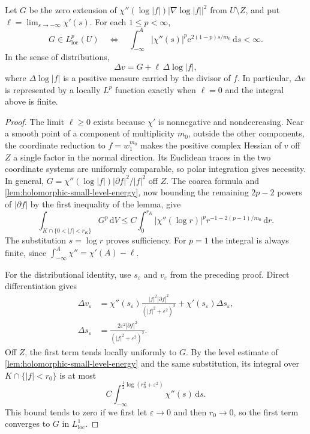 \begin{proposition}\label{prop:divisorial-laplacian-residual}
Let $G$ be the zero extension of
$\chi''(\log|f|)|\nabla\log|f||^2$ from $U\setminus Z$, and put $\ell=\lim_{s\to-\infty}\chi'(s)$. For each $1\leq p<\infty$,
\[
 G\in L^p_{\mathrm{loc}}(U)
 \quad\Longleftrightarrow\quad
 \int_{-\infty}^A|\chi''(s)|^p
        \mathrm e^{2(1-p)s/m_0}\,\mathrm ds<\infty.
\]
In the sense of distributions,
\[
 \Delta v=G+\ell\,\Delta\log|f|,
\]
where $\Delta\log|f|$ is a positive measure carried by the divisor of $f$. In particular, $\Delta v$ is represented by a locally $L^p$ function exactly when $\ell=0$ and the integral above is finite.
\end{proposition}
\begin{proof}
The limit $\ell\geq0$ exists because $\chi'$ is nonnegative and nondecreasing. Near a smooth point of a component of multiplicity $m_0$, outside the other components, the coordinate reduction to $f=w_1^{m_0}$ makes the positive complex Hessian of $v$ off $Z$ a single factor in the normal direction. Its Euclidean traces in the two coordinate systems are uniformly comparable, so polar integration gives necessity. In general,
$G=\chi''(\log|f|)|\partial f|^2/|f|^2$ off $Z$.
The coarea formula and \cref{lem:holomorphic-small-level-energy}, now bounding the remaining $2p-2$ powers of $|\partial f|$ by the first inequality of the lemma, give
\[
 \int_{K\cap\{0<|f|<r_K\}}G^p\,\mathrm dV
 \leq C\int_0^{r_K}|\chi''(\log r)|^p
             r^{-1-2(p-1)/m_0}\,\mathrm dr.
\]
The substitution $s=\log r$ proves sufficiency. For $p=1$ the integral is always finite, since $\int_{-\infty}^A\chi''=\chi'(A)-\ell$.

For the distributional identity, use $s_\varepsilon$ and $v_\varepsilon$ from the preceding proof. Direct differentiation gives
\[
 \begin{aligned}
 \Delta v_\varepsilon
 &=\chi''(s_\varepsilon)
       \frac{|f|^2|\partial f|^2}{(|f|^2+\varepsilon^2)^2}
       +\chi'(s_\varepsilon)\Delta s_\varepsilon,\\
 \Delta s_\varepsilon
 &=\frac{2\varepsilon^2|\partial f|^2}
         {(|f|^2+\varepsilon^2)^2}.
 \end{aligned}
\]
Off $Z$, the first term tends locally uniformly to $G$. By the level estimate of \cref{lem:holomorphic-small-level-energy} and the same substitution, its integral over $K\cap\{|f|<r_0\}$ is at most
\[
 C\int_{-\infty}^{\frac12\log(r_0^2+\varepsilon^2)}
                  \chi''(s)\,\mathrm ds.
\]
This bound tends to zero if we first let $\varepsilon\to0$ and then $r_0\to0$, so the first term converges to $G$ in $L^1_{\mathrm{loc}}$.


\end{proof}
